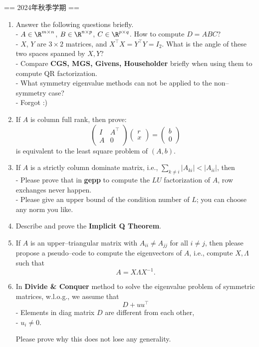 == 2024年秋季学期 ==

\begin{enumerate}
\item[1.] Answer the following questions briefly.\\
   - $A \in \R^{m\times n}$, $B \in \R^{n\times p}$, $C \in \R^{p\times q}$. How to compute $D = ABC$?\\
   - $X$, $Y$ are $3\times 2$ matrices, and $X^\top X = Y^\top Y = I_2$. What is the angle of these two spaces spanned by $X,Y$?\\
   - Compare \textbf{CGS, MGS, Givens, Householder} briefly when using them to compute QR factorization.\\
   - What symmetry eigenvalue methods can not be applied to the non--symmetry case?\\
   - Forgot :)

\item[2.] If $A$ is column full rank, then prove:
   $$\begin{pmatrix}I & A^\top\\A&0\end{pmatrix}
   \begin{pmatrix}r\\x\end{pmatrix} = \begin{pmatrix}b\\0\end{pmatrix}$$
   is equivalent to the least square problem of $(A,b)$.
\item[3.] If $A$ is a strictly column dominate matrix, i.e., $\sum_{k\neq i}|A_{ki}| < |A_{ii}|$, then\\
   - Please prove that in \textbf{gepp} to compute the $LU$ factorization of $A$, row exchanges never happen.\\
   - Please give an upper bound of the condition number of $L$; you can choose any norm you like.

\item[5.] Describe and prove the \textbf{Implicit Q Theorem}.

\item[6.] If $A$ is an upper--triangular matrix with $A_{ii}\neq A_{jj}$ for all $i\neq j$, then please propose a pseudo--code to
   compute the eigenvectors of $A$, i.e., compute $X, \Lambda$ such that
   $$A = X\Lambda X^{-1}.$$

\item[7.] In \textbf{Divide & Conquer} method to solve the eigenvalue problem of symmetric matrices, w.l.o.g., we assume that
   $$D + uu^\top$$
   - Elements in diag matrix $D$ are different from each other,\\
   - $u_i\neq 0$.
   
   Please prove why this does not lose any generality.
\end{enumerate}